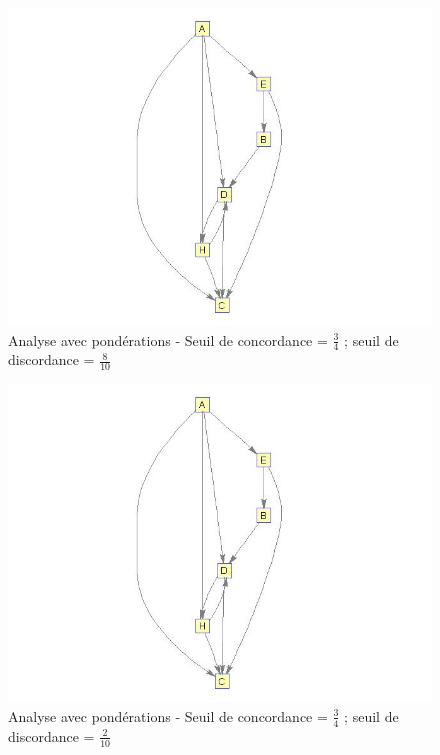\documentclass[a4paper,10pt]{article}
\begin{document}
\begin{figure}[H]
\begin{center}
\includegraphics[scale=0.3]{img/G2-pond.jpg}
\caption{Analyse avec pondérations - Seuil de concordance = $\frac{3}{4}$ ; seuil de discordance = $\frac{8}{10}$}
\end{center}
\end{figure}

\begin{figure}[H]
\begin{center}
\includegraphics[scale=0.3]{img/G3-pond.jpg}
\caption{Analyse avec pondérations - Seuil de concordance = $\frac{3}{4}$ ; seuil de discordance = $\frac{2}{10}$}
\end{center}
\end{figure}
\end{document}
